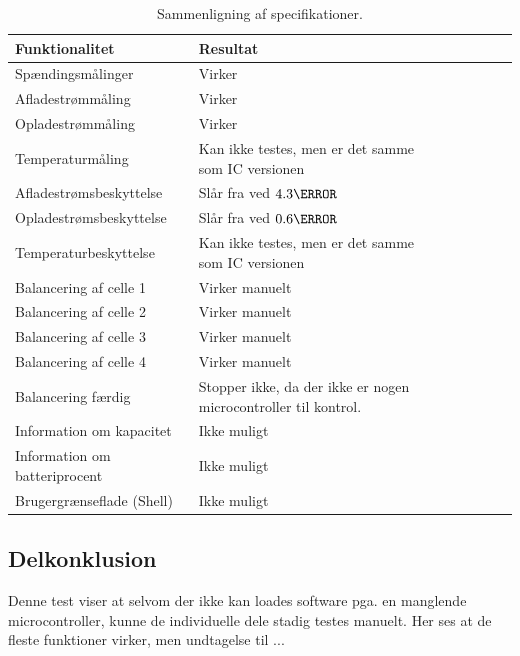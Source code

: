 \begin{table}[h!]
	\small
	\centering
	\begin{threeparttable}
		\begin{tabular}{ l l l l l l l }
			\toprule
			\multicolumn{1}{l}{\textbf{Funktionalitet}}          &
			\multicolumn{1}{l}{\textbf{Resultat}}           \\
			\hline
			Spændingsmålinger              & Virker                         \\
			Afladestrømmåling                    		& Virker                         \\
			Opladestrømmåling                    		& Virker                         \\
			Temperaturmåling                    		& Kan ikke testes, men er det samme som IC versionen    \\
			Afladestrømsbeskyttelse		& Slår fra ved $4.3\ampere$        \\
			Opladestrømsbeskyttelse   	& Slår fra ved $0.6\ampere$      \\
			Temperaturbeskyttelse          & Kan ikke testes, men er det samme som IC versionen          \\
			Balancering af celle 1         & Virker manuelt                         \\
			Balancering af celle 2        & Virker manuelt                        \\
			Balancering af celle 3        & Virker manuelt                        \\			
			Balancering af celle 4        & Virker manuelt                        \\
			Balancering færdig             & Stopper ikke, da der ikke er nogen microcontroller til kontrol.               \\
			Information om kapacitet       & Ikke muligt                          \\
			Information om batteriprocent 							& Ikke muligt			 \\
			Brugergrænseflade (Shell)                       & Ikke muligt                    \\
			
			\bottomrule
		\end{tabular}
		\caption{Sammenligning af specifikationer.}
		\label{tab:resultat_diskret}
	\end{threeparttable}
\end{table} 
\FloatBlock

\subsection{Delkonklusion}
Denne test viser at selvom der ikke kan loades software pga. en manglende microcontroller, kunne de individuelle dele stadig testes manuelt. Her ses at de fleste funktioner virker, men undtagelse til ...